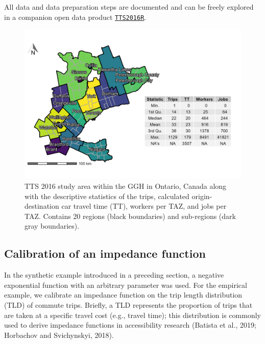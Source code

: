 \documentclass[]{elsarticle} %
\begin{document}
All data and data preparation steps are documented and can be freely
explored in a companion open data product
\href{https://github.com/soukhova/TTS2016R}{\texttt{TTS2016R}}.

\begin{figure}

{\centering \includegraphics[width=1\linewidth]{images/TTS16-survey-area} 

}

\caption{\label{fig:TTS-16-survey-area}TTS 2016 study area within the GGH in Ontario, Canada along with the descriptive statistics of the trips, calculated origin-destination car travel time (TT), workers per TAZ, and jobs per TAZ. Contains 20 regions (black boundaries) and sub-regions (dark gray boundaries).}\label{fig:TTS-16-survey-area}
\end{figure}

\hypertarget{calibration-of-an-impedance-function}{%
\subsection{Calibration of an impedance
function}\label{calibration-of-an-impedance-function}}

In the synthetic example introduced in a preceding section, a negative
exponential function with an arbitrary parameter was used. For the
empirical example, we calibrate an impedance function on the trip length
distribution (TLD) of commute trips. Briefly, a TLD represents the
proportion of trips that are taken at a specific travel cost (e.g.,
travel time); this distribution is commonly used to derive impedance
functions in accessibility research (Batista et al., 2019; Horbachov and
Svichynskyi, 2018).
\end{document}
